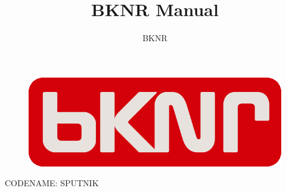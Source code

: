 \documentclass[a4paper,11pt,titlepage]{book}
\title{BKNR Manual}
\author{BKNR}
\begin{document}
\begin{titlepage}
\begin{center}

  \vspace*{6cm}
  \begin{figure}[htbp]
    \centering
    \includegraphics[scale=0.6]{bknrlogo}
  \end{figure}
  \vspace{2cm}
  \Large
  CODENAME: SPUTNIK

\end{center}
\end{titlepage}

\tableofcontents






%
%
%
\end{document}
